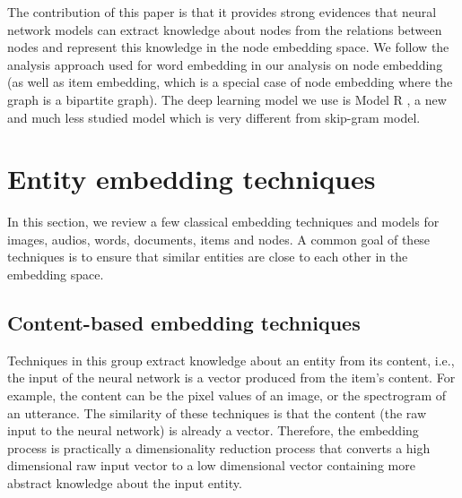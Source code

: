 \documentclass[conference]{IEEEtran}
\begin{document}
The contribution of this paper is that
it provides strong evidences that neural network models can extract
knowledge about nodes from the relations between nodes and
represent this knowledge in the node embedding space.
We follow the analysis approach used for word embedding
in our analysis on node embedding
(as well as item embedding,
which is a special case of node embedding where the graph is a bipartite graph).
The deep learning model we use is Model R \cite{hou2017deep},
a new and much less studied model which is very different from skip-gram model.


\section{Entity embedding techniques}
In this section, we review a few classical embedding techniques and models for images, audios, words, documents, items and nodes.
A common goal of these techniques is to ensure that
similar entities are close to each other in the embedding space.

\subsection{Content-based embedding techniques}
Techniques in this group extract knowledge about an entity from its content, 
i.e., the input of the neural network is a vector produced from the item's content.
For example, the content can be
the pixel values of an image, or the spectrogram of an utterance.
The similarity of these techniques is that the content
(the raw input to the neural network) is already a vector.
Therefore, the embedding process is practically a dimensionality reduction process
that converts a high dimensional raw input vector to a low dimensional vector 
containing more abstract knowledge about the input entity.
\end{document}
